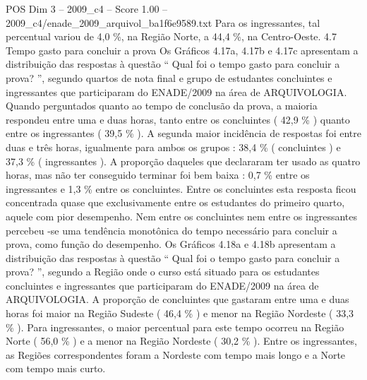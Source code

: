 \begin{textsample}{POS Dim 3 – 2009\_c4 – Score 1.00 – 2009\_c4/enade\_2009\_arquivol\_ba1f6e9589.txt}
Para os ingressantes, tal percentual variou de 4,0 \%, na Região Norte, a 44,4 \%, na Centro-Oeste. 4.7 Tempo gasto para concluir a prova Os Gráficos 4.17a, 4.17b e 4.17c apresentam a distribuição das respostas à questão “ Qual foi o tempo gasto para concluir a prova? ”, segundo quartos de nota final e grupo de estudantes concluintes e ingressantes que participaram do ENADE/2009 na área de ARQUIVOLOGIA.
Quando perguntados quanto ao tempo de conclusão da prova, a maioria respondeu entre uma e duas horas, tanto entre os concluintes ( 42,9 \% ) quanto entre os ingressantes ( 39,5 \% ).
A segunda maior incidência de respostas foi entre duas e três horas, igualmente para ambos os grupos : 38,4 \% ( concluintes ) e 37,3 \% ( ingressantes ).
A proporção daqueles que declararam ter usado as quatro horas, mas não ter conseguido terminar foi bem baixa : 0,7 \% entre os ingressantes e 1,3 \% entre os concluintes.
Entre os concluintes esta resposta ficou concentrada quase que exclusivamente entre os estudantes do primeiro quarto, aquele com pior desempenho.
Nem entre os concluintes nem entre os ingressantes percebeu -se uma tendência monotônica do tempo necessário para concluir a prova, como função do desempenho.
Os Gráficos 4.18a e 4.18b apresentam a distribuição das respostas à questão “ Qual foi o tempo gasto para concluir a prova? ”, segundo a Região onde o curso está situado para os estudantes concluintes e ingressantes que participaram do ENADE/2009 na área de ARQUIVOLOGIA.
A proporção de concluintes que gastaram entre uma e duas horas foi maior na Região Sudeste ( 46,4 \% ) e menor na Região Nordeste ( 33,3 \% ).
Para ingressantes, o maior percentual para este tempo ocorreu na Região Norte ( 56,0 \% ) e a menor na Região Nordeste ( 30,2 \% ).
Entre os ingressantes, as Regiões correspondentes foram a Nordeste com tempo mais longo e a Norte com tempo mais curto.

\end{textsample}
